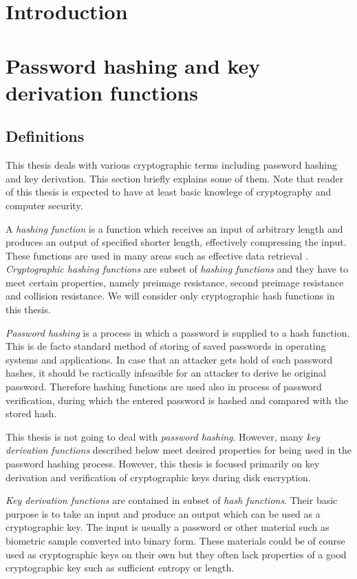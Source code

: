 \documentclass[nolof]{fithesis3}
\begin{document}
\tableofcontents
\chapter{Introduction}

\chapter{Password hashing and key derivation functions}

\section{Definitions}
\label{definitions}
This thesis deals with various cryptographic terms including password hashing and key derivation. This section briefly explains some of them. Note that reader of this thesis is expected to have at least basic knowlege of cryptography and computer security.

A \emph{hashing function} is a function which receives an input of arbitrary length and produces an output of specified shorter length, effectively compressing the input. These functions are used in many areas such as effective data retrieval \parencite{itmc14}. \emph{Cryptographic hashing functions} are subset of \emph{hashing functions} and they have to meet certain properties, namely preimage resistance, second preimage resistance and collision resistance. We will consider only cryptographic hash functions in this thesis.

\emph{Password hashing} is a process in which a password is supplied to a hash function. This is de facto standard method of storing of saved passwords in operating systems and applications. In case that an attacker gets hold of such password hashes, it should be ractically infeasible for an attacker to derive he original password. Therefore hashing functions are used also in process of password verification, during which the entered password is hashed and compared with the stored hash.

This thesis is not going to deal with \emph{password hashing}. However, many \emph{key derivation functions} described below meet desired properties for being used in the password hashing process. However, this thesis is focused primarily on key derivation and verification of cryptographic keys during disk encryption.

\emph{Key derivation functions} are contained in subset of \emph{hash functions}. Their basic purpose is to take an input and produce an output which can be used as a cryptographic key. The input is usually a password or other material such as biometric sample converted into binary form. These materials could be of course used as cryptographic keys on their own but they often lack properties of a good cryptographic key such as sufficient entropy or length. 
\end{document}
